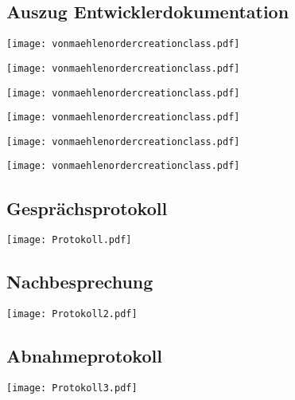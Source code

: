 \subsection{Auszug Entwicklerdokumentation}
\label{app:Doc}
\begin{center}
\texttt{[image: vonmaehlenordercreationclass.pdf]}

\texttt{[image: vonmaehlenordercreationclass.pdf]}

\texttt{[image: vonmaehlenordercreationclass.pdf]}

\texttt{[image: vonmaehlenordercreationclass.pdf]}

\texttt{[image: vonmaehlenordercreationclass.pdf]}

\texttt{[image: vonmaehlenordercreationclass.pdf]}
\end{center}
\clearpage

\subsection{Gesprächsprotokoll}
\label{app:Protokoll}
\begin{center}
\texttt{[image: Protokoll.pdf]}
\end{center}
\subsection{Nachbesprechung}
\label{app:Protokoll2}
\begin{center}
\texttt{[image: Protokoll2.pdf]}
\end{center}
\subsection{Abnahmeprotokoll}
\label{app:Protokoll3}
\begin{center}
\texttt{[image: Protokoll3.pdf]}
\end{center}

